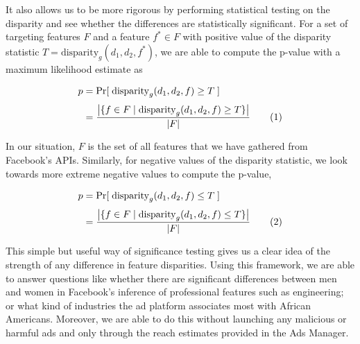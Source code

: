 It also allows us to be more rigorous by performing statistical testing on the disparity and see whether the differences are statistically significant. For a set of targeting features $F$ and a feature $f^* \in F$ with positive value of the disparity statistic $T = \text{disparity}_g(d_1, d_2, f^*)$, we are able to compute the p-value with a maximum likelihood estimate as

\begin{align*}
p &= \Pr[\; \text{disparity}_g(d_1, d_2, f) \geq T \;]\\[.3em]
&= \frac{\big|\{f \in F \; | \; \text{disparity}_g(d_1, d_2, f) \geq T\}\big|}{|F|} \addtocounter{equation}{1}\tag{\theequation}
\label{eq:p_val_positive}
\end{align*}

In our situation, $F$ is the set of all features that we have gathered from Facebook's APIs. Similarly, for negative values of the disparity statistic, we look towards more extreme negative values to compute the p-value,

\begin{align*}
p &= \Pr[\; \text{disparity}_g(d_1, d_2, f) \leq T \;]\\[.3em]
&= \frac{\big|\{f \in F \; | \; \text{disparity}_g(d_1, d_2, f) \leq T\}\big|}{|F|} \addtocounter{equation}{1}\tag{\theequation}
\label{eq:p_val_negative}
\end{align*}

This simple but useful way of significance testing gives us a clear idea of the strength of any difference in feature disparities. Using this framework, we are able to answer questions like whether there are significant differences between men and women in Facebook's inference of professional features such as engineering; or what kind of industries the ad platform associates most with African Americans. Moreover, we are able to do this without launching any malicious or harmful ads and only through the reach estimates provided in the Ads Manager.